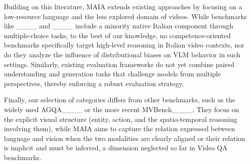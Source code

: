 Building on this literature, MAIA extends existing approaches by focusing on a low-resource language and the less explored domain of videos. While benchmarks like ____ and ____ include a minority native Italian component through multiple-choice tasks, to the best of our knowledge, no competence-oriented benchmarks specifically target high-level reasoning in Italian video contexts, nor do they analyze the influence of distributional biases on VLM behavior in such settings. Similarly, existing evaluation frameworks do not yet combine paired understanding and generation tasks that challenge models from multiple perspectives, thereby enforcing a robust evaluation strategy.


Finally, our selection of categories differs from other benchmarks, such as  the widely used AGQA____ or the more recent MVBench____. They focus on the explicit visual structure (entity, action, and the spatio-temporal reasoning involving them), while MAIA  aims to capture the relation expressed  between language and vision when the two modalities are clearly aligned or their relation is implicit and must be inferred, a dimension neglected so far in Video QA benchmarks.  







